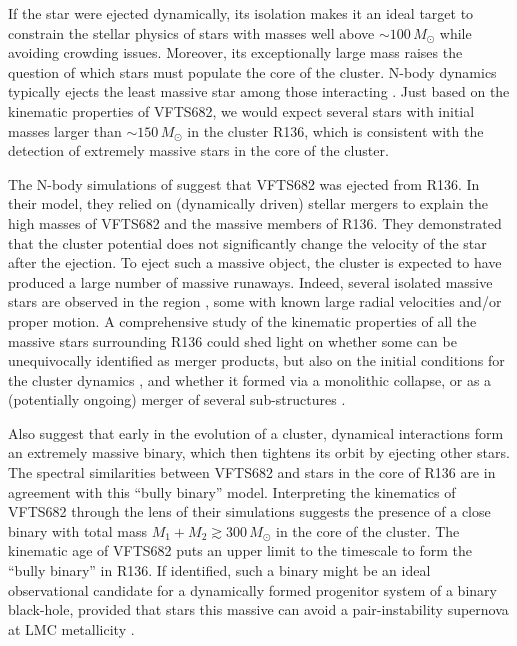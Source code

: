 \documentclass[a4paper,fleqn,usenatbib]{mnras}
\begin{document}
If the star were ejected dynamically, its isolation makes it an ideal target to constrain the stellar physics of
stars with masses well above $\sim$$100\,M_\odot$ while avoiding
crowding issues. Moreover, 
 its exceptionally large mass raises the question of which stars must populate
the core of the cluster. N-body dynamics typically ejects the least
massive star among those interacting \cite[e.g.,][]{banerjee:12}. Just
based on the kinematic properties of VFTS682, we would expect several
stars with initial masses larger than $\sim$$150\,M_\odot$ in the
cluster R136, which is consistent with the detection
of extremely massive stars in the core of the
cluster.

The N-body simulations of \citet{banerjee:12} suggest that VFTS682 was ejected from R136. In their
model, they relied on (dynamically driven) stellar mergers to explain the high masses of
VFTS682 and the massive members of R136. They
demonstrated that the cluster potential does not significantly change
the velocity of the star after the ejection.
To eject such a massive object, the cluster is
expected to have produced a large number of massive runaways. Indeed, several %
isolated massive stars are observed in the region \citep[][]{evans:10,lennon:18}, some with known
large radial velocities and/or proper motion. 
A comprehensive study of the kinematic
properties of all the massive stars surrounding R136 could shed light
on whether some can be unequivocally identified as merger products,
but also on the initial conditions for the cluster dynamics
\citep[e.g.,][]{oh:16}, and whether it formed via a monolithic collapse, or
as a (potentially ongoing) merger of several sub-structures \citep[e.g.,][]{sabbi:12}.

Also \cite{fujii:11} suggest that
early in the evolution of a cluster, dynamical interactions form an extremely
massive binary, which then tightens its orbit by ejecting other
stars. The spectral similarities between VFTS682 and stars in the core
of R136 are in agreement with this ``bully binary'' model. Interpreting the kinematics of VFTS682 through the lens of their simulations
suggests the presence of a close binary with total mass
$M_1+M_2\gtrsim 300\,M_\odot$ in the core of the cluster. The kinematic age of VFTS682 puts an
upper limit to the timescale to form the ``bully binary'' in
R136. If identified, such a binary %
might be an ideal observational candidate for a dynamically formed progenitor system of
a binary black-hole, provided that stars this massive can avoid a
pair-instability supernova \cite[e.g.,][]{rakavy:67} at LMC
metallicity \citep[see also][]{langer:07}.
\end{document}
